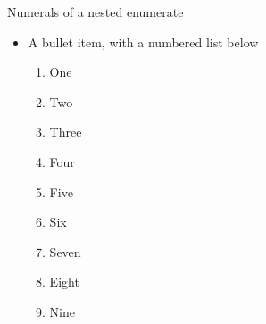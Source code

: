 \begin{standardframe}{Numerals of a nested enumerate}
	\begin{itemize}
		\item A bullet item, with a numbered list below
		\begin{enumerate}
			\item One
			\item Two
			\item Three
			\item Four
			\item Five
			\item Six
			\item Seven
			\item Eight
			\item Nine
		\end{enumerate}
	\end{itemize}
\end{standardframe}
